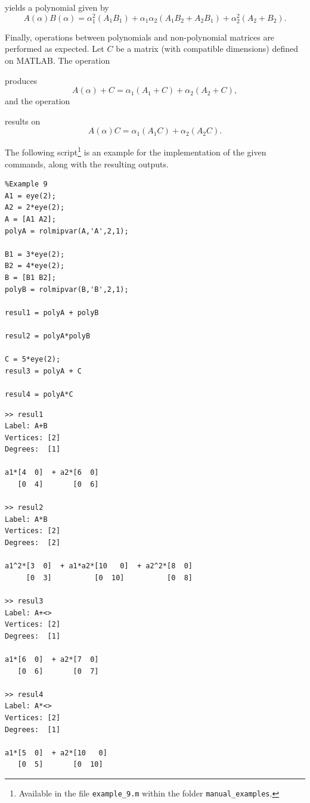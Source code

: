 \documentclass[english,11pt]{article}
\theoremstyle{break} \theorembodyfont{\small\rm}
\begin{document}
yields a polynomial given by
\[
 A(\alpha)B(\alpha) = \alpha_1^2 (A_1B_1) + \alpha_1\alpha_2 (A_1B_2 + A_2B_1) + \alpha_2^2 (A_2 + B_2).
\]

Finally, operations between polynomials and non-polynomial matrices are performed as expected. Let $C$ be
a matrix (with compatible dimensions) defined on MATLAB. The operation

\begin{minipage}{12.5cm}
\end{minipage}

produces
\[
 A(\alpha) + C = \alpha_1 (A_1 + C) + \alpha_2 (A_2 + C),
\]
and the operation

\begin{minipage}{12.5cm}
\end{minipage}

results on
\[
 A(\alpha)C = \alpha_1 (A_1C) + \alpha_2 (A_2C).
\]

\vspace{0.2cm}

The following script\footnote{Available in the file \texttt{example\_9.m} within the folder \texttt{manual\_examples}.}
is an example for the implementation of the given commands, along with the
resulting outputs.

\begin{minipage}{9.5cm}
 \begin{lstlisting}
%Example 9
A1 = eye(2);
A2 = 2*eye(2);
A = [A1 A2];
polyA = rolmipvar(A,'A',2,1);

B1 = 3*eye(2);
B2 = 4*eye(2);
B = [B1 B2];
polyB = rolmipvar(B,'B',2,1);

resul1 = polyA + polyB

resul2 = polyA*polyB

C = 5*eye(2);
resul3 = polyA + C

resul4 = polyA*C
 \end{lstlisting}
\end{minipage}
\vspace{0.2cm}

\begin{minipage}{11.5cm}
\begin{lstlisting}[rulecolor=\color{red}]
>> resul1
Label: A+B
Vertices: [2]
Degrees:  [1]
 
a1*[4  0]  + a2*[6  0] 
   [0  4]       [0  6] 

>> resul2
Label: A*B
Vertices: [2]
Degrees:  [2]
 
a1^2*[3  0]  + a1*a2*[10   0]  + a2^2*[8  0] 
     [0  3]          [0  10]          [0  8] 
     
>> resul3
Label: A+<>
Vertices: [2]
Degrees:  [1]
 
a1*[6  0]  + a2*[7  0] 
   [0  6]       [0  7]

>> resul4
Label: A*<>
Vertices: [2]
Degrees:  [1]
 
a1*[5  0]  + a2*[10   0] 
   [0  5]       [0  10]  
\end{lstlisting}
\end{minipage}
\vspace{0.2cm}
\end{document}
